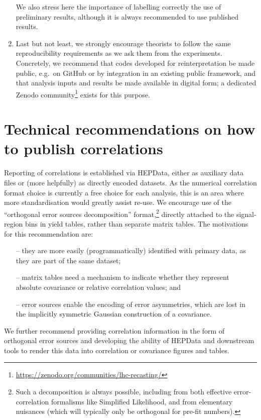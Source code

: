 \documentclass[a4paper,aps,prd,longbibliography,notitlepage,showpacs,amsmath,amssymb,superscriptaddress,nofootinbib,floatfix,11pt,preprintnumbers]{revtex4-1-mod}
\newcommand{\hepdata}{\textsf{HEPData}\xspace}
\newcommand{\zenodo}{\textsf{Zenodo}\xspace}
\newcommand{\eg}{e.g.\xspace}
\begin{document}
\begin{enumerate}
    We also stress here the importance of labelling correctly the
    use of preliminary results, although it is always recommended to use published results.
    \item Last but not least, we strongly encourage theorists to follow the same reproducibility requirements as we ask them from the experiments.
    Concretely, we recommend that codes developed for reinterpretation be made public, \eg\ on GitHub or by integration in an existing public framework, and that analysis inputs and results be made available in digital form; a dedicated \zenodo  community\footnote{\url{https://zenodo.org/communities/lhc-recasting/}} exists for this purpose.

\end{enumerate}


\appendix
\section{Technical recommendations on how to publish correlations}\label{sec:techcorr}

Reporting of correlations is established via \hepdata, either as auxiliary data files or (more helpfully) as directly encoded datasets. As the numerical correlation format choice is currently a free choice for each analysis, this is an area where more standardisation would greatly assist re-use. We encourage use of the ``orthogonal error sources decomposition'' format,\footnote{Such a decomposition is always possible, including from both effective error-correlation formalisms like Simplified Likelihood, and from elementary nuisances (which will typically only be orthogonal for pre-fit numbers).} directly attached to the signal-region bins in yield tables, rather than separate matrix tables.  The motivations for this recommendation are:
%
\begin{itemize}
    \item[--] they are more easily (programmatically) identified with primary data, as they are part of the same dataset;
    \item[--] matrix tables need a mechanism to indicate whether they represent absolute covariance or relative correlation values; and
    \item[--] error sources enable the encoding of error asymmetries, which are lost in the implicitly symmetric Gaussian construction of a covariance.
\end{itemize}
%
We further recommend providing correlation information in the form of orthogonal error sources and developing the ability of \hepdata and downstream tools to render this data into correlation or covariance figures and tables.
\end{document}

